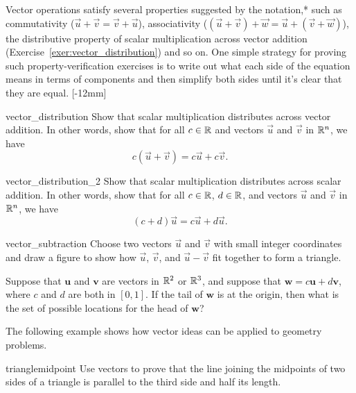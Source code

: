 \documentclass{watsonbook}
\begin{document}
Vector operations satisfy several properties suggested by the
notation,* such as commutativity
($\vec{u} + \vec{v} = \vec{v} + \vec{u}$), associativity
($(\vec{u} + \vec{v}) + \vec{w} = \vec{u} + (\vec{v} + \vec{w})$), the
distributive property of scalar multiplication across vector addition
(Exercise~\ref{exer:vector_distribution}) and so on. One simple strategy
for proving such property-verification exercises is to 
write out what each side of the equation means in terms of components and
then simplify both sides until it's clear that they are equal. [-12mm]

\begin{exercise}{}{vector_distribution}
  Show that scalar multiplication distributes across vector
  addition. In other words, show that for all $c\in \mathbb{R}$ and vectors
  $\vec{u}$ and $\vec{v}$ in $\mathbb{R}^n$, we have 
  \[
    c(\vec{u} + \vec{v})= c
    \vec{u} + c \vec{v}. 
  \] 
\end{exercise}

\begin{exercise}{}{vector_distribution_2}
  Show that scalar multiplication distributes across scalar 
  addition. In other words, show that for all $c\in \mathbb{R}$, $d \in \mathbb{R}$, and vectors
  $\vec{u}$ and $\vec{v}$ in $\mathbb{R}^n$, we have 
  \[
    (c+d)\vec{u}  = c \vec{u} + d \vec{u}. 
  \] 
\end{exercise}

\begin{exercise}{}{vector_subtraction}
  Choose two vectors $\vec{u}$ and $\vec{v}$ with small integer
  coordinates and draw a figure to show how $\vec{u}$, $\vec{v}$, and $\vec{u}
  - \vec{v}$
  fit together to form a triangle. 
\end{exercise}

\begin{exercise}{}{}
  Suppose that $\mathbf{u}$ and $\mathbf{v}$ are vectors in $\mathbb{R}^2$ or
  $\mathbb{R}^3$, and suppose that $\mathbf{w} = c \mathbf{u} + d \mathbf{v}$,
  where $c$ and $d$ are both in $[0,1]$. If the tail of $\mathbf{w}$
  is at the origin, then what is the set of possible locations for the
  head of $\mathbf{w}$?
\end{exercise}

The following example shows how vector ideas can be applied to geometry
problems. 

\begin{example}{}{trianglemidpoint}
  Use vectors to prove that the line joining the midpoints of two
  sides of a triangle is parallel to the third side and half its
  length.
\end{example}
\end{document}

